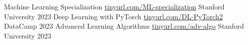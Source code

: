 
\def\mystr{3em}




\begin{cvhonors}

\cvhonor
   {Machine Learning Specialization}    %
   {
        \hfill
        \href{https://www.coursera.org/account/accomplishments/specialization/UED4Q5KFZZM8}{tinyurl.com/ML-specialization}
        \hspace{\mystr}
   }
   {Stanford University}      %
   {2023}    %
\cvhonor
   {Deep Learning with PyTorch}    %
   {
        \hfill
        \href{https://www.datacamp.com/statement-of-accomplishment/course/432e350924c6a7474e5202570621ebc6e19155ed}{tinyurl.com/DL-PyTorch2}
        \hspace{\mystr}
   }
   {DataCamp}      %
   {2023}    %
\cvhonor
   {Advanced Learning Algorithms}    %
   {
        \hfill
        \href{https://coursera.org/verify/FKVKJHSWHHTA}{tinyurl.com/adv-algo}
        \hspace{\mystr}
   }
   {Stanford University}      %
   {2023}    %

\end{cvhonors}

